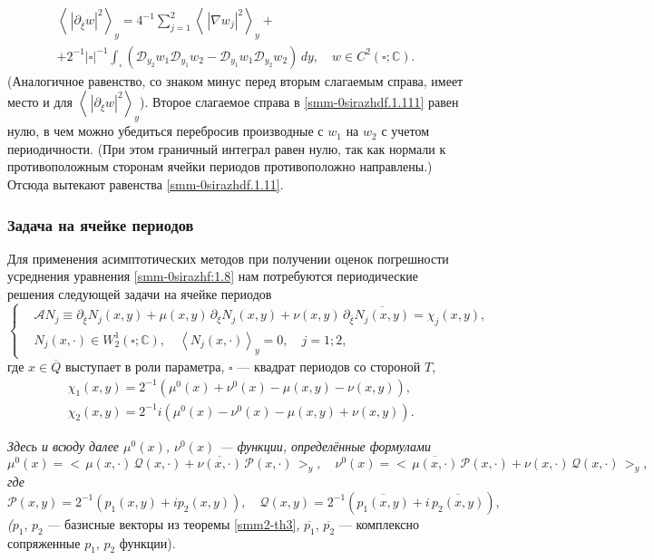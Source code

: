 \begin{equation}\label{smm-0sirazhdf.1.111}
	\begin{gathered}
		\left<\,|\partial_{\bar \xi} w|^2\right>_y=4^{-1}\sum_{j=1}^2\left<
		\,|\nabla w_j|^2\right>_y+\\
		+2^{-1}|\square|^{-1}\int_{\square}\left(\mathscr{D}_{y_2}w_1\mathscr{D}_{y_1}w_2-\mathscr{D}_{y_1}w_1\mathscr{D}_{y_2}w_2\right)\,dy,\quad w\in C^2(\square;\mathbb{C}).
	\end{gathered}
\end{equation}
(Аналогичное равенство, со знаком минус перед вторым слагаемым справа, имеет место и для $\left<\,|\partial_{\xi} w|^2\right>_y$). Второе слагаемое справа в \eqref{smm-0sirazhdf.1.111} равен нулю, в чем можно убедиться перебросив производные с
$w_1$ на $w_2$ с учетом периодичности. (При этом граничный интеграл равен нулю, так как нормали к противоположным
сторонам ячейки периодов противоположно направлены.) Отсюда вытекают равенства \eqref{smm-0sirazhdf.1.11}.

\subsubsection{Задача на ячейке периодов}
Для применения асимптотических методов при получении оценок погрешности усреднения
уравнения \eqref{smm-0sirazhf:1.8} нам потребуются периодические
решения следующей задачи на ячейке периодов
\begin{equation}\label{smm-0sirazhf:1.11}
	\left\{\begin{aligned}
		&\mathcal{A}N_j\equiv \partial_{\bar\xi}N_j(x,y)+\mu(x,y)\,\partial_\xi N_j(x,y)+\nu(x,y)\,
		\partial_{\bar\xi}\overline{N_j(x,y)}=\chi_j(x,y),\\
		& N_j(x,\cdot)\in W_2^{1}(\square;\mathbb{C}),\quad \left<N_j(x,\cdot)\right>_y=0,\quad j=1;2,
	\end{aligned}\right.
\end{equation}
где $x\in \overline Q$ выступает в роли параметра, $\square$ --- квадрат периодов со стороной $T$,
\begin{equation}\label{smm-0sirazhdf:1}
	\begin{aligned}
		&\chi_1(x,y)=2^{-1}\left(\mu^0(x)+\nu^0(x)-\mu(x,y)-\nu(x,y)\right),\\
		&\chi_2(x,y)=2^{-1}i\left(\mu^0(x)-\nu^0(x)-\mu(x,y)+\nu(x,y)\right).
	\end{aligned}
\end{equation}

\textit{Здесь и всюду далее  $\mu^0(x)$, $\nu^0(x)$ --- функции, определённые
	формулами}
\begin{equation}\label{smm-0sirazhdf:1.11}
	\mu^0(x)=\big<\,\mu(x,\cdot)\, \mathscr Q(x,\cdot)+\overline{\nu(x,\cdot)}\,\mathscr{P}(x,\cdot)\,\big>_y, \quad
	\nu^0(x)=\big<\,\overline{\mu(x,\cdot)}\,\mathscr{P}(x,\cdot)+\nu(x,\cdot)\, \mathscr Q(x,\cdot)\,\big>_y,
\end{equation}
\textit{где}
$
\mathscr{P}(x,y)=2^{-1}(p_1(x,y)+ip_2(x,y)),
\quad \mathscr Q(x,y)=2^{-1}(\overline{p_1(x,y)}+i\,\overline{p_2(x,y)}),
$
\textit($p_1$, $p_2$ ---  базисные векторы из теоремы { \ref{smm2-th3}},
$\overline{p_1}$, $\overline{p_2}$ --- комплексно сопряженные $p_1$, $p_2$
функции).

